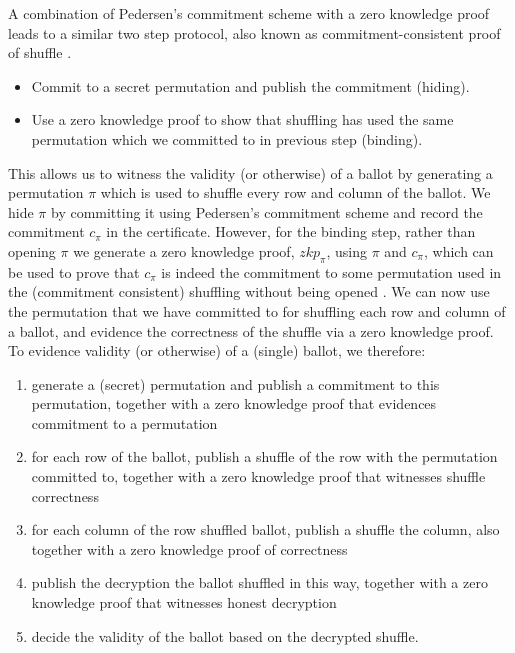 \documentclass{llncs}
\begin{document}
\noindent
A combination of Pedersen's commitment scheme 
with a zero knowledge proof leads to a similar two step protocol, also known 
as commitment-consistent proof of shuffle \cite{Wikstrom:2009:CPS}.

\begin{itemize}
\item Commit to a secret permutation and publish the commitment (hiding).
\item Use a zero knowledge proof to show that shuffling has used 
      the same permutation which we committed to in previous step (binding).
\end{itemize}  

\noindent
This allows us to witness the validity (or otherwise) of a ballot by generating a 
permutation $\pi$ which is used to shuffle every row and column of the ballot.
We hide $\pi$ by committing it using Pedersen's 
commitment scheme 
and record the commitment $c_{\pi}$ in the certificate. However, for the binding step, rather 
than opening $\pi$ we generate a zero knowledge proof, $zkp_{\pi}$, 
using $\pi$ and $c_{\pi}$, which can 
be  used to prove that $c_{\pi}$ is indeed the commitment to some permutation
used in the (commitment consistent) shuffling 
 without being opened \cite{Wikstrom:2009:CPS}. We can now use the
 permutation that we have committed to for 
shuffling each row and column of a ballot, and evidence the
correctness of the shuffle via a zero knowledge proof.
%
To evidence validity (or otherwise) of a (single) ballot, we
therefore:
\begin{enumerate}
  \item generate a (secret) permutation and publish a commitment to this
  permutation, together with a zero knowledge proof that evidences commitment
  to a permutation
  \item for each row of the ballot, publish a shuffle of the row with
  the permutation committed to, together with a zero knowledge proof
  that witnesses shuffle correctness
  \item for each column of the row shuffled ballot, publish a
  shuffle the column, also together with a zero knowledge proof of
  correctness 
  \item publish the decryption the ballot shuffled in this way, together with a
  zero knowledge proof that witnesses honest decryption
  \item decide the validity of the ballot based on the decrypted
  shuffle.
\end{enumerate}
\end{document}
